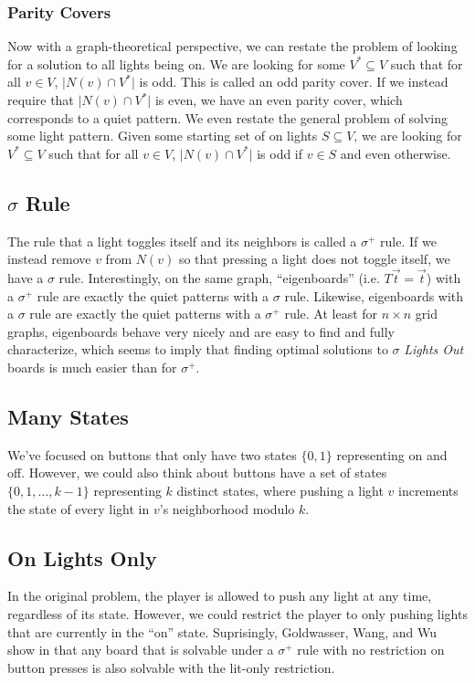 \documentclass[a4paper]{article}
\begin{document}
	\subsubsection{Parity Covers}
	Now with a graph-theoretical perspective, we can restate the problem of looking for a solution to all lights being on.
	We are looking for some $V^* \subseteq V$ such that for all $v \in V$, $\lvert N(v) \cap V^* \rvert$ is odd.
	This is called an odd parity cover.
	If we instead require that $\lvert N(v) \cap V^* \rvert$ is even, we have an even parity cover, which corresponds to a quiet pattern.
	We even restate the general problem of solving some light pattern.
	Given some starting set of on lights $S \subseteq V$, we are looking for $V^* \subseteq V$ such that for all $v \in V$, $\lvert N(v) \cap V^* \rvert$ is odd if $v \in S$ and even otherwise.
	
	\subsection{$\sigma$ Rule}
	The rule that a light toggles itself and its neighbors is called a $\sigma^+$ rule.
	If we instead remove $v$ from $N(v)$ so that pressing a light does not toggle itself, we have a $\sigma$ rule.
	Interestingly, on the same graph, ``eigenboards'' (i.e. $T\vec{t} = \vec{t}$) with a $\sigma^+$ rule are exactly the quiet patterns with a $\sigma$ rule.
	Likewise, eigenboards with a $\sigma$ rule are exactly the quiet patterns with a $\sigma^+$ rule.
	At least for $n \times n$ grid graphs, eigenboards behave very nicely and are easy to find and fully characterize, which seems to imply that finding optimal solutions to $\sigma$ \textit{Lights Out} boards is much easier than for $\sigma^+$.
	
	\subsection{Many States}
	We've focused on buttons that only have two states $\{0,1\}$ representing on and off.
	However, we could also think about buttons have a set of states $\{0,1,\dots,k-1\}$ representing $k$ distinct states, where pushing a light $v$ increments the state of every light in $v$'s neighborhood modulo $k$.
	
	\subsection{On Lights Only}
	In the original problem, the player is allowed to push any light at any time, regardless of its state.
	However, we could restrict the player to only pushing lights that are currently in the ``on'' state.
	Suprisingly, Goldwasser, Wang, and Wu show in \cite{GOLDWASSER2009774} that any board that is solvable under a $\sigma^+$ rule with no restriction on button presses is also solvable with the lit-only restriction.

	\newpage
	
	
\end{document}
